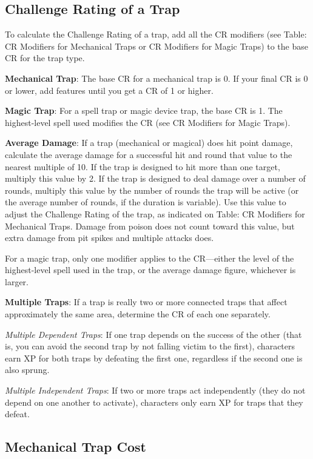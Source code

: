 \subsection{Challenge Rating of a Trap}

				
To calculate the Challenge Rating of a trap, add all the CR modifiers (see Table: CR Modifiers for Mechanical Traps or CR Modifiers for Magic Traps) to the base CR for the trap type.
				
\textbf{Mechanical Trap}: The base CR for a mechanical trap is 0. If your final CR is 0 or lower, add features until you get a CR of 1 or higher.
				
\textbf{Magic Trap}: For a spell trap or magic device trap, the base CR is 1. The highest-level spell used modifies the CR (see CR Modifiers for Magic Traps).
				
\textbf{Average Damage}: If a trap (mechanical or magical) does hit point damage, calculate the average damage for a successful hit and round that value to the nearest multiple of 10. If the trap is designed to hit more than one target, multiply this value by 2. If the trap is designed to deal damage over a number of rounds, multiply this value by the number of rounds the trap will be active (or the average number of rounds, if the duration is variable). Use this value to adjust the Challenge Rating of the trap, as indicated on Table: CR Modifiers for Mechanical Traps. Damage from poison does not count toward this value, but extra damage from pit spikes and multiple attacks does.
				
For a magic trap, only one modifier applies to the CR---either the level of the highest-level spell used in the trap, or the average damage figure, whichever is larger.
				
\textbf{Multiple Traps}: If a trap is really two or more connected traps that affect approximately the same area, determine the CR of each one separately.
				
\textit{Multiple Dependent Traps}: If one trap depends on the success of the other (that is, you can avoid the second trap by not falling victim to the first), characters earn XP for both traps by defeating the first one, regardless if the second one is also sprung.
				
\textit{Multiple Independent Traps}: If two or more traps act independently (they do not depend on one another to activate), characters only earn XP for traps that they defeat.
				
\subsection{Mechanical Trap Cost}


